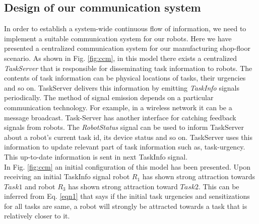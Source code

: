 \documentclass{llncs}
\begin{document}
\subsection{Design of our communication system}
In order to establish a system-wide continuous flow of information, we need to implement a suitable communication system for our robots. Here we have presented a centralized communication system for our manufacturing shop-floor scenario.
As shown in Fig. \ref{fig:ccm}, in this model there exists a centralized \textit{
TaskServer} that is responsible for disseminating task information to robots. The contents of task information can be physical locations of tasks, their urgencies and so on. TaskServer delivers this information by emitting \textit{TaskInfo} signals periodically. The method of signal emission depends on a particular communication technology. For example, in a wireless network it can be a message broadcast.
Task-Server has another interface for catching feedback signals from robots. The \textit{RobotStatus} signal can be used to inform TaskServer about a robot's current task id, its device status and so on. TaskServer uses this information to update relevant part of task information such as, task-urgency. This up-to-date information is sent in next TaskInfo signal.\\
In Fig. \ref{fig:ccm} an initial configuration of this model has been presented. Upon receiving an initial TaskInfo signal robot $R_1$ has shown strong attraction towards $Task1$ and robot $R_3$ has shown strong attraction toward $Task2$. This can be inferred from Eq. \ref{eqn1} that says if the initial task urgencies and sensitizations for all tasks are same, a robot will strongly be attracted towards a task that is relatively closer to it.
\end{document}
